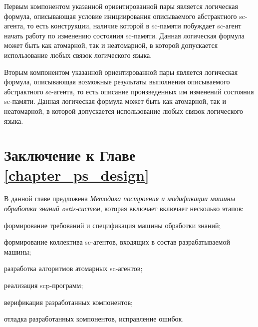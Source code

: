 \begin{SCn}
\begin{scnindent}
{    Первым компонентом указанной ориентированной пары является логическая формула, описывающая условие инициирования описываемого абстрактного sc-агента, то есть конструкции, наличие которой в sc-памяти побуждает sc-агент начать работу по изменению состояния sc-памяти. Данная логическая формула может быть как атомарной, так и неатомарной, в которой допускается использование любых связок логического языка.
    
    Вторым компонентом указанной ориентированной пары является логическая формула, описывающая возможные результаты выполнения описываемого абстрактного sc-агента, то есть описание произведенных им изменений состояния sc-памяти. Данная логическая формула может быть как атомарной, так и неатомарной, в которой допускается использование любых связок логического языка.}
\end{scnindent}
\begin{scnindent}
\end{scnindent}
\end{SCn}

\section*{Заключение к Главе \ref{chapter_ps_design}}

В данной главе предложена \textit{Методика построения и модификации машины обработки знаний ostis-систем}, которая включает включает несколько этапов:
\begin{textitemize}
    \item формирование требований и спецификация машины обработки знаний;
    \item формирование коллектива sc-агентов, входящих в состав разрабатываемой машины;
    \item разработка алгоритмов атомарных sc-агентов;
    \item реализация scp-программ;
    \item верификация разработанных компонентов;
    \item отладка разработанных компонентов, исправление ошибок.
\end{textitemize}

